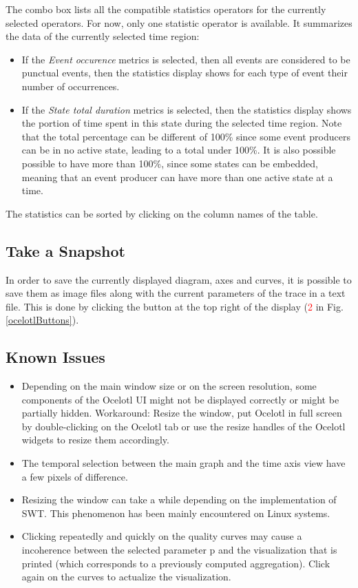 \documentclass[twoside]{article}
\begin{document}
\begin{sloppypar}
The combo box lists all the compatible statistics operators for the currently selected operators. For now, only one statistic operator is available. It summarizes the data of the currently selected time region:
\begin{itemize} 
	\item If the \textit{Event occurence} metrics is selected, then all events are considered to be punctual events, then the statistics display shows for each type of event their number of occurrences.
	\item If the \textit{State total duration} metrics is selected, then the statistics display shows the portion of time spent in this state during the selected time region. Note that the total percentage can be different of 100\% since some event producers can be in no active state, leading to a total under 100\%. It is also possible possible to have more than 100\%, since some states can be embedded, meaning that an event producer can have more than one active state at a time.
\end{itemize}

The statistics can be sorted by clicking on the column names of the table.

\subsection{Take a Snapshot}
In order to save the currently displayed diagram, axes and curves, it is possible to save them as image files along with the current parameters of the trace in a text file. This is done by clicking the button at the top right of the display (\textcolor{red}{2} in Fig. \ref{ocelotlButtons}).

\subsection{Known Issues}

\begin{itemize}
 \item Depending on the main window size or on the screen resolution, some components of the Ocelotl UI might not be displayed correctly or might be partially hidden.
Workaround: Resize the window, put Ocelotl in full screen by double-clicking on the Ocelotl tab or use the resize handles of the Ocelotl widgets to resize them accordingly.
\item The temporal selection between the main graph and the time axis view have a few pixels of difference.
\item Resizing the window can take a while depending on the implementation of SWT. This phenomenon has been mainly encountered on Linux systems.
\item Clicking repeatedly and quickly on the quality curves may cause a incoherence between the selected parameter p and the visualization that is printed (which corresponds to a previously computed aggregation). Click again on the curves to actualize the visualization.
\end{itemize}


\end{sloppypar}
\end{document}
